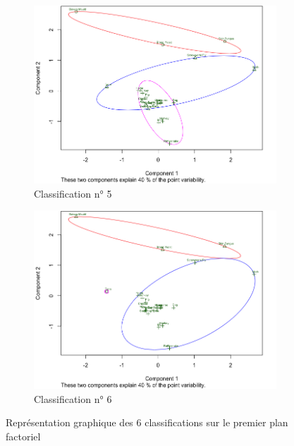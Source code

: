 \documentclass[a4paper,10pt]{report}
\begin{document}
\begin{figure}[H]
\begin{subfigure}[b]{0.5\linewidth}
		\centering
		\captionsetup{justification=centering}
		\includegraphics[width=1\linewidth]{img/3-3-mut-K-means-class-5}
		\caption{\small Classification n° 5}
		\label{fig:3-3-mut-K-means-class-5}
	\end{subfigure}%
	\begin{subfigure}[b]{0.5\linewidth}
		\centering
		\captionsetup{justification=centering}
		\includegraphics[width=1\linewidth]{img/3-3-mut-K-means-class-6}
		\caption{\small Classification n° 6}
		\label{fig:3-3-mut-K-means-class-6}
	\end{subfigure}%
	\caption{\small Représentation graphique des 6 classifications sur le premier plan factoriel}
	\label{fig:3-3-Mut-KMeans}
\end{figure}
\end{document}
